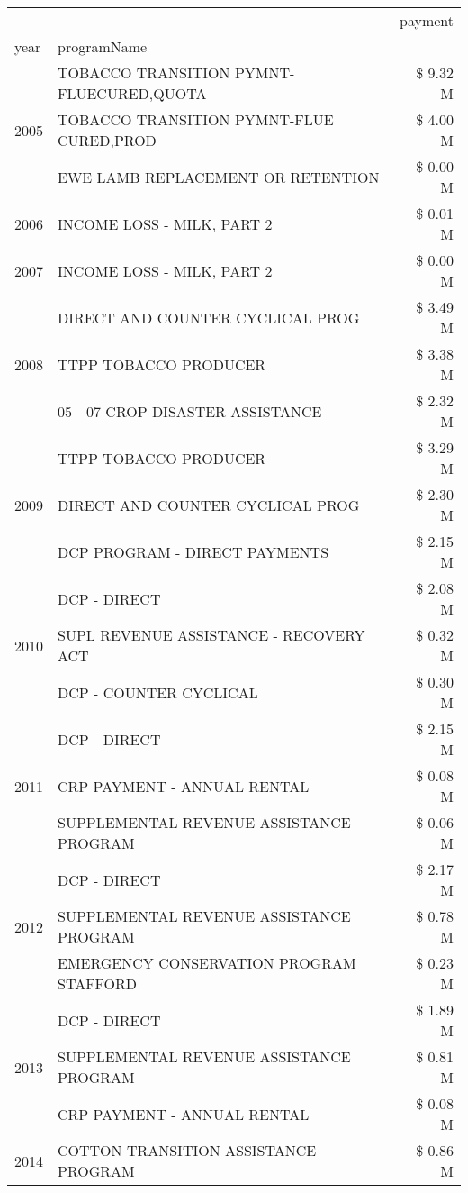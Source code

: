 \begin{tabular}{llr}
\toprule
 &  & payment \\
year & programName &  \\
\midrule
\multirow[t]{3}{*}{2005} & TOBACCO TRANSITION PYMNT-FLUECURED,QUOTA & \$ 9.32 M \\
 & TOBACCO TRANSITION PYMNT-FLUE CURED,PROD & \$ 4.00 M \\
 & EWE LAMB REPLACEMENT OR RETENTION & \$ 0.00 M \\
\cline{1-3}
2006 & INCOME LOSS - MILK, PART 2 & \$ 0.01 M \\
\cline{1-3}
2007 & INCOME LOSS - MILK, PART 2 & \$ 0.00 M \\
\cline{1-3}
\multirow[t]{3}{*}{2008} & DIRECT AND COUNTER CYCLICAL PROG & \$ 3.49 M \\
 & TTPP TOBACCO PRODUCER & \$ 3.38 M \\
 & 05 - 07 CROP DISASTER ASSISTANCE & \$ 2.32 M \\
\cline{1-3}
\multirow[t]{3}{*}{2009} & TTPP TOBACCO PRODUCER & \$ 3.29 M \\
 & DIRECT AND COUNTER CYCLICAL PROG & \$ 2.30 M \\
 & DCP PROGRAM - DIRECT PAYMENTS & \$ 2.15 M \\
\cline{1-3}
\multirow[t]{3}{*}{2010} & DCP - DIRECT & \$ 2.08 M \\
 & SUPL REVENUE ASSISTANCE - RECOVERY ACT & \$ 0.32 M \\
 & DCP - COUNTER CYCLICAL & \$ 0.30 M \\
\cline{1-3}
\multirow[t]{3}{*}{2011} & DCP - DIRECT & \$ 2.15 M \\
 & CRP PAYMENT - ANNUAL RENTAL & \$ 0.08 M \\
 & SUPPLEMENTAL REVENUE ASSISTANCE PROGRAM & \$ 0.06 M \\
\cline{1-3}
\multirow[t]{3}{*}{2012} & DCP - DIRECT & \$ 2.17 M \\
 & SUPPLEMENTAL REVENUE ASSISTANCE PROGRAM & \$ 0.78 M \\
 & EMERGENCY CONSERVATION PROGRAM STAFFORD & \$ 0.23 M \\
\cline{1-3}
\multirow[t]{3}{*}{2013} & DCP - DIRECT & \$ 1.89 M \\
 & SUPPLEMENTAL REVENUE ASSISTANCE PROGRAM & \$ 0.81 M \\
 & CRP PAYMENT - ANNUAL RENTAL & \$ 0.08 M \\
\cline{1-3}
\multirow[t]{3}{*}{2014} & COTTON TRANSITION ASSISTANCE PROGRAM & \$ 0.86 M \\

\end{tabular}
